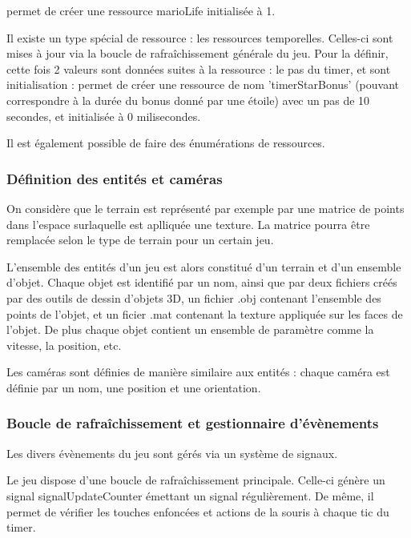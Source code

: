  permet de créer une ressource marioLife initialisée à 1.

Il existe un type spécial de ressource : les ressources temporelles.
Celles-ci sont mises à jour via la boucle de rafraîchissement générale du jeu.
Pour la définir, cette fois 2 valeurs sont données suites à la ressource : le pas du timer, et sont initialisation :
 permet de créer une ressource de nom 'timerStarBonus' (pouvant correspondre à la durée du bonus donné par une étoile)
avec un pas de 10 secondes, et initialisée à 0 milisecondes. 

Il est également possible de faire des énumérations de ressources.

\subsubsection{Définition des entités et caméras}

On considère que le terrain est représenté par exemple par une matrice de points dans l'espace surlaquelle est aplliquée une texture.
La matrice pourra être remplacée selon le type de terrain pour un certain jeu. 

L'ensemble des entités d'un jeu est alors constitué d'un terrain et d'un ensemble d'objet.
Chaque objet est identifié par un nom, ainsi que par deux fichiers créés par des outils de dessin d'objets 3D, un fichier .obj contenant l'ensemble
des points de l'objet, et un ficier .mat contenant la texture appliquée sur les faces de l'objet.
De plus chaque objet contient un ensemble de paramètre comme la vitesse, la position, etc. 

Les caméras sont définies de manière similaire aux entités : chaque caméra est définie par un nom, une position et une orientation.


\subsubsection{Boucle de rafraîchissement et gestionnaire d'évènements}

Les divers évènements du jeu sont gérés via un système de signaux.

Le jeu dispose d'une boucle de rafraîchissement principale. Celle-ci génère un signal
signalUpdateCounter émettant un signal régulièrement.
De même, il permet de vérifier les touches enfoncées et actions de la souris à chaque tic du timer.

